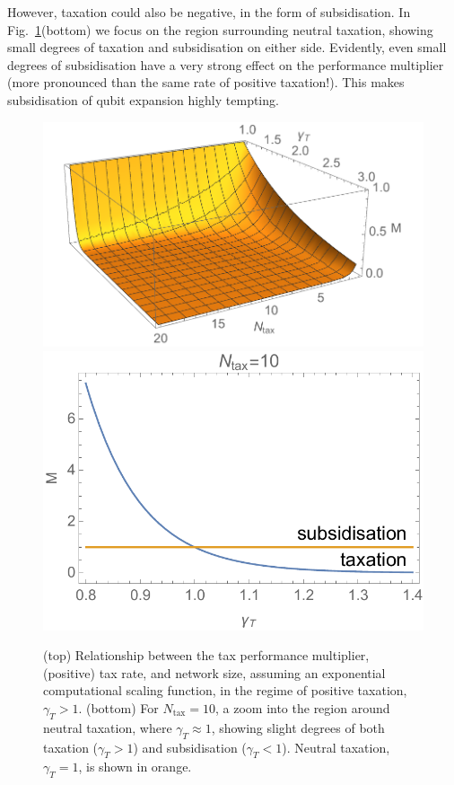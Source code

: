However, taxation could also be negative, in the form of subsidisation. In Fig.~\ref{fig:tax_exp}(bottom) we focus on the region surrounding neutral taxation, showing small degrees of taxation and subsidisation on either side. Evidently, even small degrees of subsidisation have a very strong effect on the performance multiplier (more pronounced than the same rate of positive taxation!). This makes subsidisation of qubit expansion highly tempting.

\begin{figure}[!htb]
\includegraphics[width=\columnwidth]{tax_exp} \\
\includegraphics[width=\columnwidth]{tax_subsidy}
\caption{(top) Relationship between the tax performance multiplier, (positive) tax rate, and network size, assuming an exponential computational scaling function, in the regime of positive taxation, \mbox{$\gamma_T>1$}. (bottom) For \mbox{$N_\text{tax}=10$}, a zoom into the region around neutral taxation, where \mbox{$\gamma_T\approx 1$}, showing slight degrees of both taxation (\mbox{$\gamma_T>1$}) and subsidisation (\mbox{$\gamma_T<1$}). Neutral taxation, \mbox{$\gamma_T=1$}, is shown in orange.}\label{fig:tax_exp}	
\end{figure}

